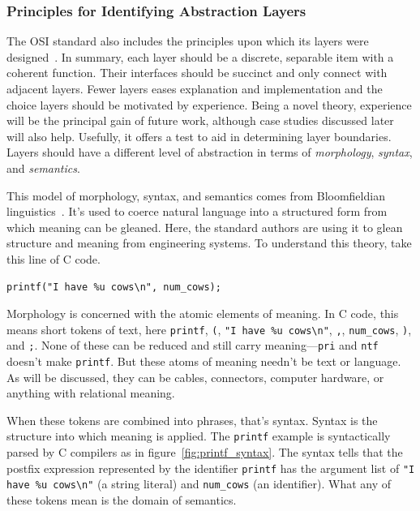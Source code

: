 \documentclass[english,12pt,a4paper,pdftex,eng,utf8]{aaltothesis}
\begin{document}
\subsubsection{Principles for Identifying Abstraction Layers}

The OSI standard also includes the principles upon which its layers were designed~\cite[§6.2.1]{ISO7498-1}. In summary, each layer should be a discrete, separable item with a coherent function. Their interfaces should be succinct and only connect with adjacent layers. Fewer layers eases explanation and implementation and the choice layers should be motivated by experience. Being a novel theory, experience will be the principal gain of future work, although case studies discussed later will also help. Usefully, it offers a test to aid in determining layer boundaries. Layers should have a different level of abstraction in terms of \textit{morphology}, \textit{syntax}, and \textit{semantics}.

This model of morphology, syntax, and semantics comes from Bloomfieldian linguistics~\cite{Bloomfield1923}. It's used to coerce natural language into a structured form from which meaning can be gleaned. Here, the standard authors are using it to glean structure and meaning from engineering systems. To understand this theory, take this line of C code.

\begin{verbatim}
printf("I have %u cows\n", num_cows);
\end{verbatim}

Morphology is concerned with the atomic elements of meaning. In C code, this means short tokens of text, here \verb|printf|, \verb|(|, \verb|"I have %u cows\n"|, \verb|,|, \verb|num_cows|, \verb|)|, and \verb|;|. None of these can be reduced and still carry meaning---\verb|pri| and \verb|ntf| doesn't make \verb|printf|. But these atoms of meaning needn't be text or language. As will be discussed, they can be cables, connectors, computer hardware, or anything with relational meaning.

When these tokens are combined into phrases, that's syntax. Syntax is the structure into which meaning is applied. The \verb|printf| example is syntactically parsed by C compilers as in figure~\ref{fig:printf_syntax}. The syntax tells that the postfix expression represented by the identifier \verb|printf| has the argument list of \verb|"I have %u cows\n"| (a string literal) and \verb|num_cows| (an identifier). What any of these tokens mean is the domain of semantics.
\end{document}
